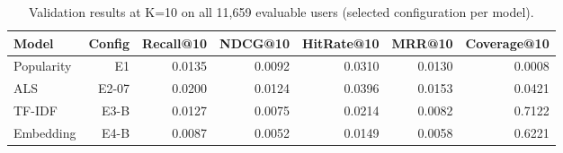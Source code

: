 \begin{table}[t]
\centering
\caption{Validation results at K=10 on all 11,659 evaluable users (selected configuration per model).}
\label{tab:main-k10}
\begin{tabular}{lrrrrrr}
\hline
Model & Config & Recall@10 & NDCG@10 & HitRate@10 & MRR@10 & Coverage@10 \\
\hline
Popularity & E1 & 0.0135 & 0.0092 & 0.0310 & 0.0130 & 0.0008 \\
ALS & E2-07 & 0.0200 & 0.0124 & 0.0396 & 0.0153 & 0.0421 \\
TF-IDF & E3-B & 0.0127 & 0.0075 & 0.0214 & 0.0082 & 0.7122 \\
Embedding & E4-B & 0.0087 & 0.0052 & 0.0149 & 0.0058 & 0.6221 \\
\hline
\end{tabular}
\end{table}
